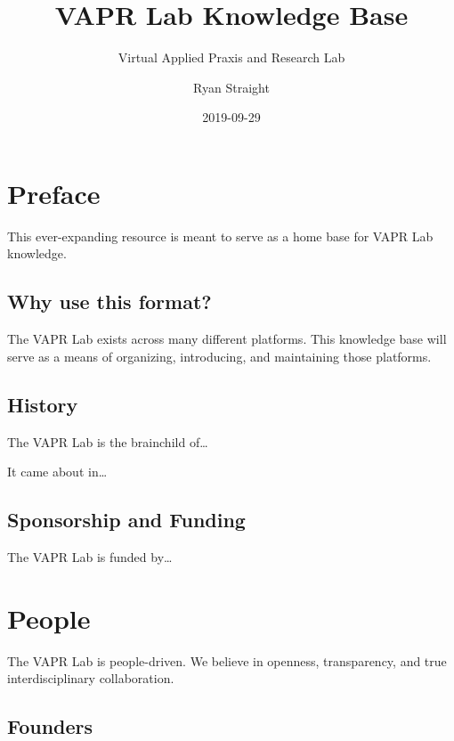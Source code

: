 \documentclass[12pt,]{memoir}
\title{VAPR Lab Knowledge Base}
\subtitle{Virtual Applied Praxis and Research Lab}
\author{Ryan Straight}
\date{2019-09-29}
\begin{document}
\maketitle

{
\hypersetup{linkcolor=black}
\setcounter{tocdepth}{1}
\tableofcontents
}
\listoftables
\listoffigures
\hypertarget{preface}{%
\chapter*{Preface}\label{preface}}

This ever-expanding resource is meant to serve as a home base for VAPR Lab knowledge.

\hypertarget{why-use-this-format}{%
\section*{Why use this format?}\label{why-use-this-format}}

The VAPR Lab exists across many different platforms. This knowledge base will serve as a means of organizing, introducing, and maintaining those platforms.

\hypertarget{history}{%
\section*{History}\label{history}}

The VAPR Lab is the brainchild of\ldots{}

It came about in\ldots{}

\hypertarget{sponsorship-and-funding}{%
\section*{Sponsorship and Funding}\label{sponsorship-and-funding}}

The VAPR Lab is funded by\ldots{}

\hypertarget{people}{%
\chapter{People}\label{people}}

The VAPR Lab is people-driven. We believe in openness, transparency, and true interdisciplinary collaboration.

\hypertarget{founders}{%
\section{Founders}\label{founders}}
\end{document}
